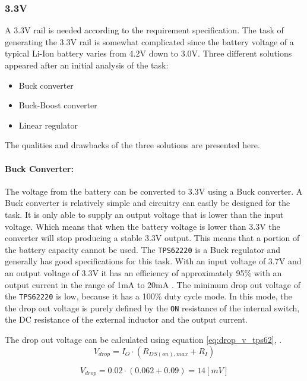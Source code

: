 \subsubsection{3.3V}
A 3.3V rail is needed according to the requirement specification.
The task of generating the 3.3V rail is somewhat complicated since the battery voltage of a typical Li-Ion battery varies from 4.2V down to 3.0V.
Three different solutions appeared after an initial analysis of the task:

\begin{itemize}
	\item Buck converter
	\item Buck-Boost converter
	\item Linear regulator
\end{itemize}

The qualities and drawbacks of the three solutions are presented here.

\paragraph{Buck Converter:}
The voltage from the battery can be converted to 3.3V using a Buck converter.
A Buck converter is relatively simple and circuitry can easily be designed for the task.
It is only able to supply an output voltage that is lower than the input voltage.
Which means that when the battery voltage is lower than 3.3V the converter will stop producing a stable 3.3V output.
This means that a portion of the battery capacity cannot be used.
The \texttt{TPS62220} is a Buck regulator and generally has good specifications for this task. 
With an input voltage of 3.7V and an output voltage of 3.3V it has an efficiency of approximately 95\% with an output current in the range of 1mA to 20mA \cite{TPS6222}.
The minimum drop out voltage of the \texttt{TPS62220} is low, because it has a 100\% duty cycle mode.
In this mode, the the drop out voltage is purely defined by the \texttt{ON} resistance of the internal switch, the DC resistance of the external inductor and the output current.

The drop out voltage can be calculated using equation \ref{eq:drop_v_tps62}, \cite{TPS6222}.
\begin{equation}
	V_{drop} = I_{O} \cdot (R_{DS(on),max}+R_I)
	\label{eq:drop_v_tps62}
\end{equation}

\begin{equation}
	V_{drop} = 0.02 \cdot (0.062+0.09) = 14 [mV]
	\label{eq:drop_v_tps62_2}
\end{equation}

